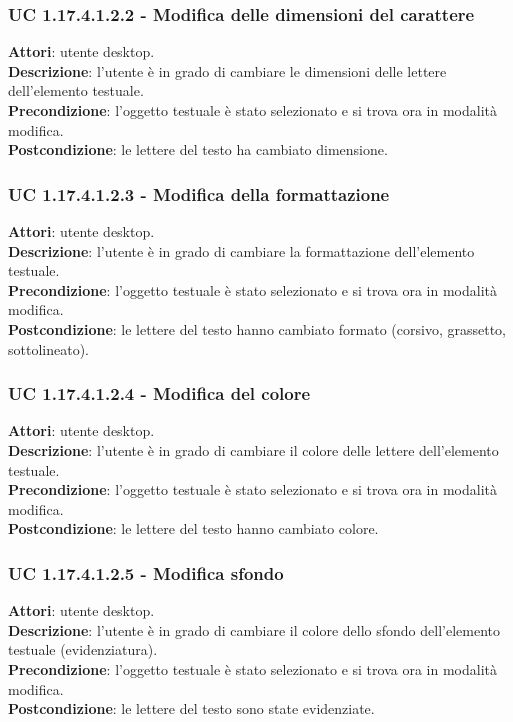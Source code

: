 \subsubsection{UC 1.17.4.1.2.2 - Modifica delle dimensioni del carattere}{
	\label{uc1.17.4.1.2.2}
	\textbf{Attori}: utente desktop. \\
	\textbf{Descrizione}: l'utente è in grado di cambiare le dimensioni delle lettere dell’elemento testuale. \\
	\textbf{Precondizione}: l'oggetto testuale è stato selezionato e si trova ora in modalità modifica.\\
	\textbf{Postcondizione}: le lettere del testo ha cambiato dimensione.	\\
	}
\subsubsection{UC 1.17.4.1.2.3 - Modifica della formattazione}{
	\label{uc1.17.4.1.2.3}
	\textbf{Attori}: utente desktop. \\
	\textbf{Descrizione}: l'utente è in grado di cambiare la formattazione dell’elemento testuale. \\
	\textbf{Precondizione}: l'oggetto testuale è stato selezionato e si trova ora in modalità modifica.\\
	\textbf{Postcondizione}: le lettere del testo hanno cambiato formato (corsivo, grassetto, sottolineato).	\\
	}
\subsubsection{UC 1.17.4.1.2.4 - Modifica del colore}{
	\label{uc1.17.4.1.2.4}
	\textbf{Attori}: utente desktop. \\
	\textbf{Descrizione}: l'utente è in grado di cambiare il colore delle lettere dell’elemento testuale. \\
	\textbf{Precondizione}: l'oggetto testuale è stato selezionato e si trova ora in modalità modifica.\\
	\textbf{Postcondizione}: le lettere del testo hanno cambiato colore.	\\
	}
\subsubsection{UC 1.17.4.1.2.5 - Modifica sfondo}{
	\label{uc1.17.4.1.2.5}
	\textbf{Attori}: utente desktop. \\
	\textbf{Descrizione}: l'utente è in grado di cambiare il colore dello sfondo dell’elemento testuale (evidenziatura). \\
	\textbf{Precondizione}: l'oggetto testuale è stato selezionato e si trova ora in modalità modifica.\\
	\textbf{Postcondizione}: le lettere del testo sono state evidenziate.	\\
	}
